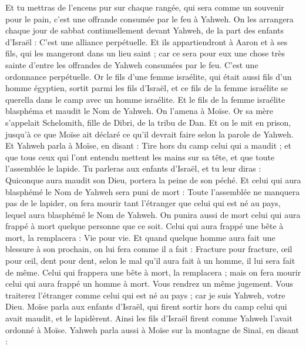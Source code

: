 \begin{multicols}{2}
Et tu mettras de l'encens pur sur chaque rangée, qui sera comme un souvenir pour le pain, c'est une offrande consumée par le feu à Yahweh.
On les arrangera chaque jour de sabbat continuellement devant Yahweh, de la part des enfants d'Israël : C'est une alliance perpétuelle.
Et ils appartiendront à Aaron et à ses fils, qui les mangeront dans un lieu saint ; car ce sera pour eux une chose très sainte d'entre les offrandes de Yahweh consumées par le feu. C'est une ordonnance perpétuelle.
Or le fils d'une femme israélite, qui était aussi fils d'un homme égyptien, sortit parmi les fils d'Israël, et ce fils de la femme israélite se querella dans le camp avec un homme israélite.
Et le fils de la femme israélite blasphéma et maudit le Nom de Yahweh. On l'amena à Moïse. Or sa mère s'appelait Schelomith, fille de Dibri, de la tribu de Dan.
Et on le mit en prison, jusqu'à ce que Moïse ait déclaré ce qu'il devrait faire selon la parole de Yahweh.
Et Yahweh parla à Moïse, en disant :
Tire hors du camp celui qui a maudit ; et que tous ceux qui l'ont entendu mettent les mains sur sa tête, et que toute l'assemblée le lapide.
Tu parleras aux enfants d'Israël, et tu leur diras : Quiconque aura maudit son Dieu, portera la peine de son péché.
Et celui qui aura blasphémé le Nom de Yahweh sera puni de mort : Toute l'assemblée ne manquera pas de le lapider, on fera mourir tant l'étranger que celui qui est né au pays, lequel aura blasphémé le Nom de Yahweh.
On punira aussi de mort celui qui aura frappé à mort quelque personne que ce soit.
Celui qui aura frappé une bête à mort, la remplacera : Vie pour vie.
Et quand quelque homme aura fait une blessure à son prochain, on lui fera comme il a fait :
Fracture pour fracture, œil pour œil, dent pour dent, selon le mal qu'il aura fait à un homme, il lui sera fait de même.
Celui qui frappera une bête à mort, la remplacera ; mais on fera mourir celui qui aura frappé un homme à mort.
Vous rendrez un même jugement. Vous traiterez l'étranger comme celui qui est né au pays ; car je suis Yahweh, votre Dieu.
Moïse parla aux enfants d'Israël, qui firent sortir hors du camp celui qui avait maudit, et le lapidèrent. Ainsi les fils d'Israël firent comme Yahweh l'avait ordonné à Moïse.
\VerseOne{}Yahweh parla aussi à Moïse sur la montagne de Sinaï, en disant :

\end{multicols}
